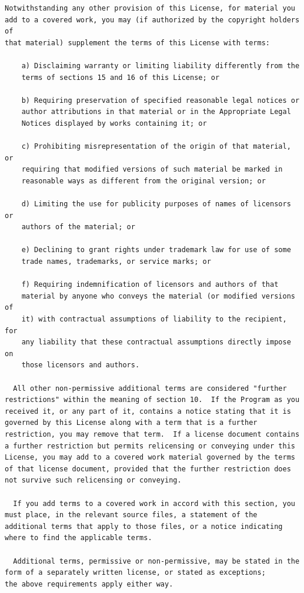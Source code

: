 \documentclass[letterpaper,10pt,english]{sphinxmanual}
\begin{document}
\begin{Verbatim}[commandchars=\\\{\}]
  Notwithstanding any other provision of this License, for material you
add to a covered work, you may (if authorized by the copyright holders of
that material) supplement the terms of this License with terms:

    a) Disclaiming warranty or limiting liability differently from the
    terms of sections 15 and 16 of this License; or

    b) Requiring preservation of specified reasonable legal notices or
    author attributions in that material or in the Appropriate Legal
    Notices displayed by works containing it; or

    c) Prohibiting misrepresentation of the origin of that material, or
    requiring that modified versions of such material be marked in
    reasonable ways as different from the original version; or

    d) Limiting the use for publicity purposes of names of licensors or
    authors of the material; or

    e) Declining to grant rights under trademark law for use of some
    trade names, trademarks, or service marks; or

    f) Requiring indemnification of licensors and authors of that
    material by anyone who conveys the material (or modified versions of
    it) with contractual assumptions of liability to the recipient, for
    any liability that these contractual assumptions directly impose on
    those licensors and authors.

  All other non-permissive additional terms are considered "further
restrictions" within the meaning of section 10.  If the Program as you
received it, or any part of it, contains a notice stating that it is
governed by this License along with a term that is a further
restriction, you may remove that term.  If a license document contains
a further restriction but permits relicensing or conveying under this
License, you may add to a covered work material governed by the terms
of that license document, provided that the further restriction does
not survive such relicensing or conveying.

  If you add terms to a covered work in accord with this section, you
must place, in the relevant source files, a statement of the
additional terms that apply to those files, or a notice indicating
where to find the applicable terms.

  Additional terms, permissive or non-permissive, may be stated in the
form of a separately written license, or stated as exceptions;
the above requirements apply either way.


\end{Verbatim}
\end{document}
